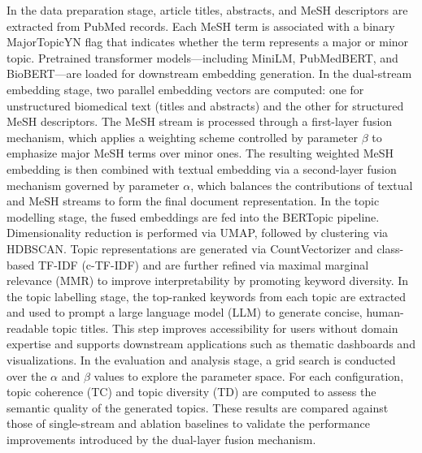 \documentclass[authorproof,JACIII,researchpaper]{fujipressarticle}
\begin{document}
In the data preparation stage, article titles, abstracts, and MeSH descriptors are extracted from PubMed records. Each MeSH term is associated with a binary MajorTopicYN flag that indicates whether the term represents a major or minor topic. Pretrained transformer models---including MiniLM, PubMedBERT, and BioBERT---are loaded for downstream embedding generation.
In the dual-stream embedding stage, two parallel embedding vectors are computed: one for unstructured biomedical text (titles and abstracts) and the other for structured MeSH descriptors. The MeSH stream is processed through a first-layer fusion mechanism, which applies a weighting scheme controlled by parameter $\beta$ to emphasize major MeSH terms over minor ones. The resulting weighted MeSH embedding is then combined with textual embedding via a second-layer fusion mechanism governed by parameter $\alpha$, which balances the contributions of textual and MeSH streams to form the final document representation.
In the topic modelling stage, the fused embeddings are fed into the BERTopic pipeline. Dimensionality reduction is performed via UMAP, followed by clustering via HDBSCAN. Topic representations are generated via CountVectorizer and class-based TF-IDF (c-TF-IDF) and are further refined via maximal marginal relevance (MMR) to improve interpretability by promoting keyword diversity.
In the topic labelling stage, the top-ranked keywords from each topic are extracted and used to prompt a large language model (LLM) to generate concise, human-readable topic titles. This step improves accessibility for users without domain expertise and supports downstream applications such as thematic dashboards and visualizations.
In the evaluation and analysis stage, a grid search is conducted over the $\alpha$ and $\beta$ values to explore the parameter space. For each configuration, topic coherence (TC) and topic diversity (TD) are computed to assess the semantic quality of the generated topics. These results are compared against those of single-stream and ablation baselines to validate the performance improvements introduced by the dual-layer fusion mechanism.
\end{document}
